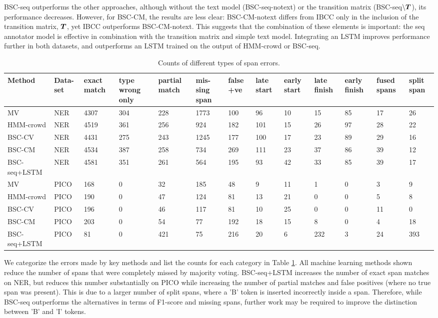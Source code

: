 BSC-seq outperforms the other approaches, although 
without the text model (BSC-seq-notext) or the transition matrix (BSC-seq$\backslash\boldsymbol T$),
its performance decreases.
However, for BSC-CM, the results are less clear: BSC-CM-notext differs from IBCC only in the 
inclusion of the transition matrix, $\boldsymbol T$, yet IBCC outperforms BSC-CM-notext.
This suggests that the combination of these elements is important: the seq annotator model is effective 
in combination with the transition matrix and simple text model.
Integrating an LSTM improves performance further in both datasets, and outperforms an LSTM trained on the output of HMM-crowd or BSC-seq.

\begin{table}[h]
\small
\begin{tabularx}{\textwidth}{l X X X X X X X X X X X X}
\toprule
Method & Data-set & exact match & type wrong only & partial match & mis-sing span & false +ve & late start & early start & late finish & early finish & fused spans & split span \\ \midrule
MV & NER & 4307 & 304 & 228 & 1773 & 100 & 96 & 10 & 15 & 85 & 17 & 26 \\
HMM-crowd & NER & 4519 & 361 & 256 & 924 & 182 & 101 & 15 & 26 & 97 & 28 & 22 \\
BSC-CV & NER & 4431 & 275 & 243 & 1245 & 177 & 100 & 17 & 23 & 89 & 29 & 16 \\
BSC-CM & NER & 4534 & 387 & 258 & 734 & 269 & 111 & 23 & 37 & 86 & 39 & 12 \\
BSC-seq+LSTM & NER & 4581 & 351 & 261 & 564 & 195 & 93 & 42 & 33 & 85 & 39 & 17 \\
\midrule
MV & PICO    & 168 & 0 & 32 & 185 & 48 & 9 & 11 & 1 & 0 & 3 & 9 \\
HMM-crowd    & PICO & 190 & 0 & 47 & 124 & 81 & 13 & 21 & 0 & 0 & 5 & 8 \\
BSC-CV       & PICO & 196 & 0 & 46 & 117 & 81 & 10 & 25 & 0 & 0 & 11 & 0 \\
BSC-CM       & PICO & 203 & 0 & 54 & 77 & 192 & 18 & 15 & 8 & 0 & 4 & 18 \\
BSC-seq+LSTM & PICO & 81 & 0 & 421 & 75 & 216 & 20 & 6 & 232 & 3 & 24 & 393 \\
\bottomrule
\end{tabularx}
\caption{Counts of different types of span errors.}
\label{tab:error_analysis}
\end{table}
We categorize the errors made by key methods and list the
counts for each category in Table \ref{tab:error_analysis}.
All machine learning methods shown reduce the number of spans that were completely missed by majority
voting. 
BSC-seq+LSTM increases the number of exact span matches on NER, but reduces this number substantially on PICO
while increasing the number of partial matches and false positives (where no true span was present). 
This is due to a larger number of split spans, where a 'B' token is inserted incorrectly inside
a span. 
Therefore, while BSC-seq outperforms the alternatives in terms of F1-score and missing spans, 
further work may be required to improve the distinction between 'B' and 'I' tokens. 


